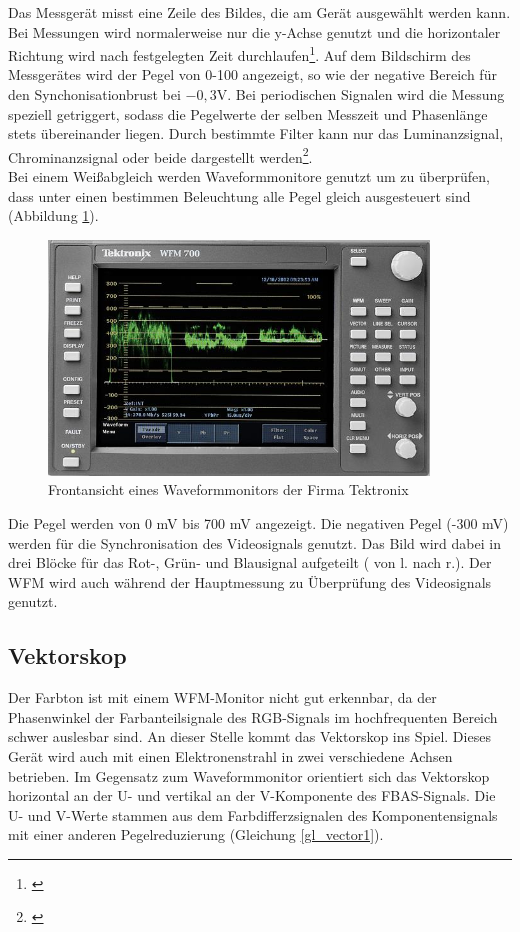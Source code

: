 Das Messgerät misst eine Zeile des Bildes, die am Gerät ausgewählt werden kann. Bei Messungen wird normalerweise nur die y-Achse genutzt und die horizontaler Richtung wird nach festgelegten Zeit durchlaufen\footnote{\cite[110]{schmidt}}. Auf dem Bildschirm des Messgerätes wird der Pegel von 0-100 angezeigt, so wie der negative Bereich für den Synchonisationbrust bei $-0,3$V. Bei periodischen Signalen wird die Messung speziell getriggert, sodass die Pegelwerte der selben Messzeit und Phasenlänge stets übereinander liegen. Durch bestimmte Filter kann nur das Luminanzsignal, Chrominanzsignal oder beide dargestellt werden\footnote{\cite[111]{schmidt}}.\\
Bei einem Weißabgleich werden Waveformmonitore genutzt um zu überprüfen, dass unter einen bestimmen Beleuchtung alle Pegel gleich ausgesteuert sind (Abbildung \ref{b_wmf}).

\begin{figure}[H]     %
\centering
\includegraphics[width=0.9\textwidth]{bilder/wmf} 
\caption {Frontansicht eines Waveformmonitors der Firma Tektronix\protect\footnotemark}\label{b_wmf}
\end{figure}

Die Pegel werden von 0 mV bis 700 mV angezeigt. Die negativen Pegel (-300 mV) werden für die Synchronisation des Videosignals genutzt. Das Bild wird dabei in drei Blöcke für das Rot-, Grün- und Blausignal aufgeteilt ( von l. nach r.). Der WFM wird auch während der Hauptmessung zu Überprüfung des Videosignals genutzt.

\subsection{Vektorskop}
\label{sec_vector}
Der Farbton ist mit einem WFM-Monitor nicht gut erkennbar, da der Phasenwinkel der Farbanteilsignale des RGB-Signals im hochfrequenten Bereich schwer auslesbar sind. An dieser Stelle kommt das Vektorskop ins Spiel. Dieses Gerät wird auch mit einen Elektronenstrahl in zwei verschiedene Achsen betrieben. Im Gegensatz zum Waveformmonitor orientiert sich das Vektorskop horizontal an der U- und vertikal an der V-Komponente des FBAS-Signals. Die U- und V-Werte stammen aus dem Farbdifferzsignalen des Komponentensignals mit einer anderen Pegelreduzierung (Gleichung \ref{gl_vector1}).

